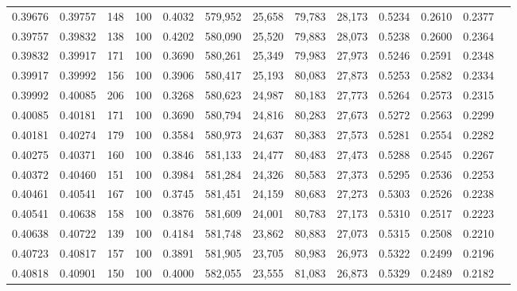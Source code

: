 \begin{tabular}{rrrrrrrrrrrrr}
0.39676 & 0.39757 &   148 & 100 &                                     0.4032 & 579,952 &  25,658 &  79,783 &  28,173 & 0.5234 & 0.2610 & 0.2377 \\
0.39757 & 0.39832 &   138 & 100 &                                     0.4202 & 580,090 &  25,520 &  79,883 &  28,073 & 0.5238 & 0.2600 & 0.2364 \\
0.39832 & 0.39917 &   171 & 100 &                                     0.3690 & 580,261 &  25,349 &  79,983 &  27,973 & 0.5246 & 0.2591 & 0.2348 \\
0.39917 & 0.39992 &   156 & 100 &                                     0.3906 & 580,417 &  25,193 &  80,083 &  27,873 & 0.5253 & 0.2582 & 0.2334 \\
0.39992 & 0.40085 &   206 & 100 &                                     0.3268 & 580,623 &  24,987 &  80,183 &  27,773 & 0.5264 & 0.2573 & 0.2315 \\
0.40085 & 0.40181 &   171 & 100 &                                     0.3690 & 580,794 &  24,816 &  80,283 &  27,673 & 0.5272 & 0.2563 & 0.2299 \\
0.40181 & 0.40274 &   179 & 100 &                                     0.3584 & 580,973 &  24,637 &  80,383 &  27,573 & 0.5281 & 0.2554 & 0.2282 \\
0.40275 & 0.40371 &   160 & 100 &                                     0.3846 & 581,133 &  24,477 &  80,483 &  27,473 & 0.5288 & 0.2545 & 0.2267 \\
0.40372 & 0.40460 &   151 & 100 &                                     0.3984 & 581,284 &  24,326 &  80,583 &  27,373 & 0.5295 & 0.2536 & 0.2253 \\
0.40461 & 0.40541 &   167 & 100 &                                     0.3745 & 581,451 &  24,159 &  80,683 &  27,273 & 0.5303 & 0.2526 & 0.2238 \\
0.40541 & 0.40638 &   158 & 100 &                                     0.3876 & 581,609 &  24,001 &  80,783 &  27,173 & 0.5310 & 0.2517 & 0.2223 \\
0.40638 & 0.40722 &   139 & 100 &                                     0.4184 & 581,748 &  23,862 &  80,883 &  27,073 & 0.5315 & 0.2508 & 0.2210 \\
0.40723 & 0.40817 &   157 & 100 &                                     0.3891 & 581,905 &  23,705 &  80,983 &  26,973 & 0.5322 & 0.2499 & 0.2196 \\
0.40818 & 0.40901 &   150 & 100 &                                     0.4000 & 582,055 &  23,555 &  81,083 &  26,873 & 0.5329 & 0.2489 & 0.2182 \\

\end{tabular}
